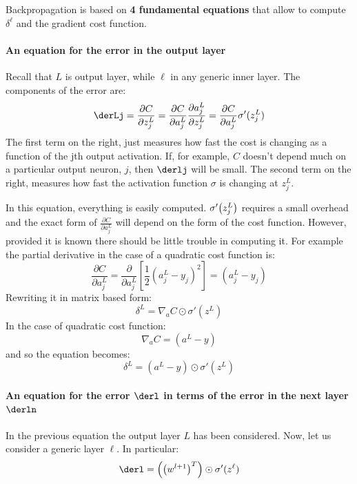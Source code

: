 \documentclass[12pt, letterpaper]{article}
\theoremstyle{definition}
\DeclarePairedDelimiter\autobracket{(}{)}
\newcommand{\br}[1]{\autobracket*{#1}}
\let\tb\textbf
\begin{document}
Backpropagation is based on \tb{4 fundamental equations} that allow to compute $\delta^\ell$ and the gradient cost function.


\paragraph{\tb{An equation for the error in the output layer}} Recall that $L$ is output layer, while $\ell$ in any generic inner layer. The components of the error are:
\begin{equation}
\derLj =\frac{\partial C}{\partial z_j^L} = \frac{\partial C}{\partial a_j^L} \frac{\partial a_j^L}{\partial z_j^L} = \frac{\partial C}{\partial a_j^L} \sigma'(z_j^L)
\end{equation}
The first term on the right, just measures how fast the cost is changing as a function of the jth output activation. If, for example, $C$ doesn't depend much on a particular output neuron, $j$, then $\derlj$ will be small. The second term on the right, measures how fast the activation function $\sigma$ is changing at $z^L_j$.

In this equation, everything is easily computed. $\sigma'\br{z_j^L}$ requires a small overhead and the exact form of $\frac{\partial C}{\partial a_j^L}$ will depend on the form of the cost function. However, provided it is known there should be little trouble in computing it. For example the partial derivative in the case of a quadratic cost function is:
\begin{equation}
\frac{\partial C}{\partial a_j^L} = \frac{\partial }{\partial a_j^L} \left[\frac{1}{2}\left( a_j^L - y_j\right)^2 \right]=\left( a_j^L - y_j\right)
\label{eq:NN1}
\end{equation}
Rewriting it in matrix based form:
\begin{equation}
\delta^L = \nabla_a C \odot \sigma'(z^L)
\end{equation}
In the case of quadratic cost function:
\begin{equation}
 \nabla_a C = \left( a^L - y\right)
\end{equation}
and so the equation becomes:
\begin{equation}
\delta^L = \left( a^L - y\right) \odot \sigma'(z^L)
\end{equation}

\paragraph{\tb{An equation for the error $\derl$ in terms of the error in the next layer $\derln$}} In the previous equation the output layer $L$ has been considered. Now, let us consider a generic layer $\ell$. In particular:
\begin{equation}
\derl = \br{\br{w^{l+1}}^T}\odot \sigma'(z^\ell)
\end{equation}
\end{document}
